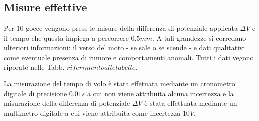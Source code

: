 \documentclass[]{article}
\let\oldsubsection\subsection%
\renewcommand{\subsection}{%
	\renewcommand{\theequation}{\thesubsection.\arabic{equation}}%
	\oldsubsection}%
\begin{document}
    \subsection {Misure effettive}

    Per 10 gocce vengono prese le misure della differenza di potenziale applicata $ \Delta V $ e il tempo che questa impiega a percorrere $ 0.5 mm $. A tali grandezze si corredano ulteriori informazioni: il verso del moto - se sale o se scende - e dati qualitativi come eventuale presenza di rumore e comportamenti anomali.
    Tutti i dati vegono riporate nelle Tabb. $ riferimento alle tabelle$.

    La misurazione del tempo di volo è stata effetuata mediante un cronometro digitale di precisione $ 0.01 s $ a cui non viene attribuita alcuna incertezza e la misurazione della differenza di potenziale $ \Delta V $ è stata effettuata mediante un multimetro digitale a cui viene attribuita come incertezza $ 10 V $.
\end{document}

